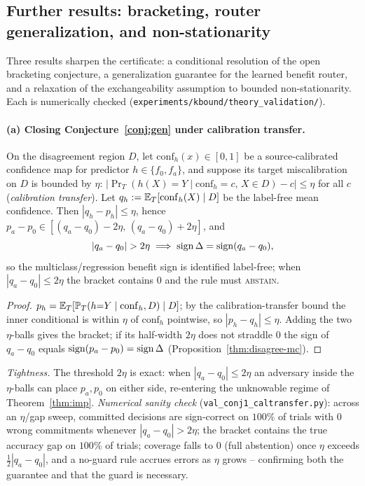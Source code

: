 \subsection{Further results: bracketing, router generalization, and non-stationarity}\label{sec:theory-ext}
Three results sharpen the certificate: a conditional resolution of the open bracketing
conjecture, a generalization guarantee for the learned benefit router, and a relaxation of the
exchangeability assumption to bounded non-stationarity. Each is numerically checked
(\texttt{experiments/kbound/theory\_validation/}).

\paragraph{(a) Closing Conjecture~\ref{conj:gen} under calibration transfer.}
\begin{proposition}\label{thm:caltransfer}
On the disagreement region $D$, let $\mathrm{conf}_h(x)\in[0,1]$ be a source-calibrated confidence
map for predictor $h\in\{f_0,f_a\}$, and suppose its target miscalibration on $D$ is bounded by
$\eta$: $|\Pr_T(h(X){=}Y\mid \mathrm{conf}_h{=}c,\,X\in D)-c|\le\eta$ for all $c$
(\emph{calibration transfer}). Let $q_h:=\mathbb{E}_T[\mathrm{conf}_h(X)\mid D]$ be the label-free mean
confidence. Then $|q_h-p_h|\le\eta$, hence $p_a-p_0\in[(q_a-q_0)-2\eta,\,(q_a-q_0)+2\eta]$, and
\[
|q_a-q_0|>2\eta \;\Longrightarrow\; \sign\Delta=\sign(q_a-q_0),
\]
so the multiclass/regression benefit sign is identified label-free; when $|q_a-q_0|\le2\eta$ the
bracket contains $0$ and the rule must \textsc{abstain}.
\end{proposition}
\begin{proof}
$p_h=\mathbb{E}_T[\mathbb{P}_T(h{=}Y\mid \mathrm{conf}_h,D)\mid D]$; by the calibration-transfer bound the inner
conditional is within $\eta$ of $\mathrm{conf}_h$ pointwise, so $|p_h-q_h|\le\eta$. Adding the two
$\eta$-balls gives the bracket; if its half-width $2\eta$ does not straddle $0$ the sign of
$q_a-q_0$ equals $\operatorname{sign}(p_a-p_0)=\operatorname{sign}\Delta$ (Proposition~\ref{thm:disagree-mc}). \qedhere
\end{proof}
\noindent\emph{Tightness.} The threshold $2\eta$ is exact: when $|q_a-q_0|\le2\eta$ an adversary
inside the $\eta$-balls can place $p_a,p_0$ on either side, re-entering the unknowable regime of
Theorem~\ref{thm:imp}. \emph{Numerical sanity check} (\texttt{val\_conj1\_caltransfer.py}): across
an $\eta$/gap sweep, committed decisions are sign-correct on $100\%$ of trials with $0$ wrong
commitments whenever $|q_a-q_0|>2\eta$; the bracket contains the true accuracy gap on $100\%$ of
trials; coverage falls to $0$ (full abstention) once $\eta$ exceeds $\tfrac12|q_a-q_0|$, and a
no-guard rule accrues errors as $\eta$ grows -- confirming both the guarantee and that the guard is
necessary.

